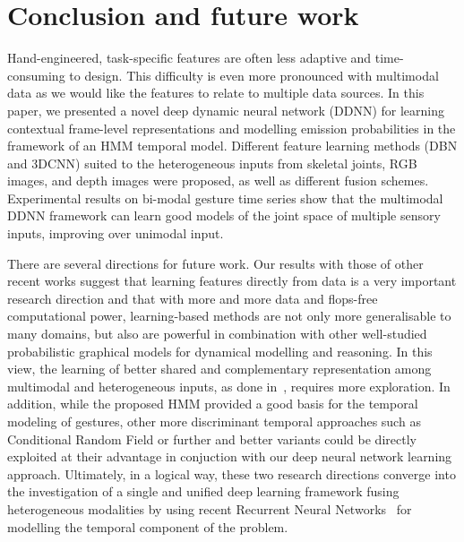 
\section{Conclusion and future work}
\label{sec:conclusion}

Hand-engineered, task-specific features are often less adaptive and time-consuming to design.
This difficulty is even more pronounced with multimodal data as we would like the features
to relate to multiple data sources.
%
In this paper, we presented a novel deep dynamic neural network (DDNN)
for learning contextual frame-level representations and modelling emission probabilities in the framework of an HMM temporal model.
%
Different feature learning methods (DBN and 3DCNN) suited to the heterogeneous inputs from skeletal joints, RGB images, and depth images
were proposed, as well as different fusion schemes.
%
Experimental results on bi-modal gesture time series  show that the multimodal DDNN framework can learn
good models of the joint space of multiple sensory inputs, improving over  unimodal input.



There are several directions for future work.
%
Our results with those of other recent works suggest that learning features directly from data is a very important research direction
and that with more and more data and flops-free  computational power, learning-based methods are not only more generalisable to many domains,
but also are powerful in combination  with other well-studied probabilistic graphical models
for dynamical modelling and reasoning.
%
In this view, the learning of  better shared and complementary representation among multimodal  and heterogeneous  inputs,
as done in~\cite{neverova2014moddrop}, requires more exploration.
%
In addition, while the proposed HMM provided a good basis for the temporal modeling of gestures,
other more discriminant temporal approaches such as Conditional Random Field or further and better variants
\cite{wang2006hidden} could be directly exploited at their advantage in conjuction with our deep neural network  learning approach.
%
Ultimately, in a logical way, these two research directions converge into the investigation of
a single and unified deep learning framework fusing heterogeneous modalities
by using recent Recurrent Neural Networks~\cite{graves2009novel} for modelling the temporal component of the problem.


\endinput
